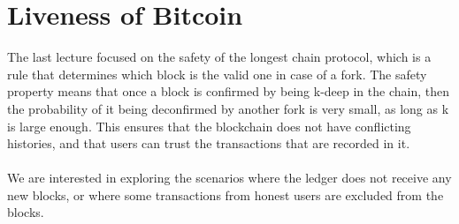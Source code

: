 \chapter{Liveness of Bitcoin}
The last lecture focused on the safety of the longest chain protocol, which is a rule that determines which block is the valid one in case of a fork. The safety property means that once a block is confirmed by being k-deep in the chain, then the probability of it being deconfirmed by another fork is very small, as long as k is large enough. This ensures that the blockchain does not have conflicting histories, and that users can trust the transactions that are recorded in it.\\\\
We are interested in exploring the scenarios where the ledger does not receive any new blocks, or where some transactions from honest users are excluded from the blocks. 
